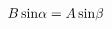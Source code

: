 \documentclass[preview]{standalone}
\begin{document}
\begin{align*}
B \, {\rm sin} \alpha = A \, {\rm sin} \beta
\end{align*}
\end{document}
